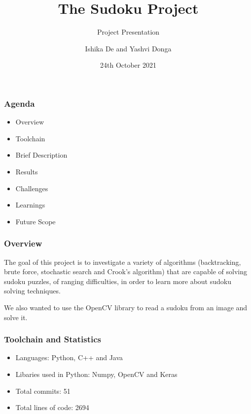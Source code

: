 \documentclass{beamer}
\title{The Sudoku Project}
\subtitle{Project Presentation}
\author[Ishika | Yashvi]{Ishika De and Yashvi Donga}
\date{24th October 2021}
\begin{document}
\begin{frame}
     \titlepage
\end{frame}
\begin{frame}
     \frametitle{Agenda}
     \begin{itemize}
          \item Overview
          \item Toolchain
          \item Brief Description
          \item Results
          \item Challenges
          \item Learnings
          \item Future Scope
     \end{itemize}
\end{frame}

\begin{frame}
     \frametitle{Overview}
     The goal of this project is to investigate a variety of algorithms (backtracking, brute force, stochastic search and Crook's algorithm) that are capable of solving sudoku puzzles, of ranging difficulties, in order to learn more about sudoku solving techniques.\newline

     We also wanted to use the OpenCV library to read a sudoku from an image and solve it.
\end{frame}

\begin{frame}
    \frametitle{Toolchain and Statistics}
    \begin{itemize}
         \item Languages: Python, C++ and Java
         \item Libaries used in Python: Numpy, OpenCV and Keras
         \item Total commits: 51
         \item Total lines of code: 2694
    \end{itemize}
\end{frame}
\end{document}
